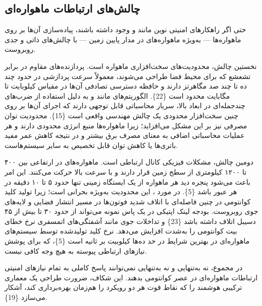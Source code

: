 \documentclass[a4paper,14pt]{extreport}
\begin{document}
\subsection{چالش‌های ارتباطات ماهواره‌ای}

حتی اگر راهکارهای امنیتی نوین مانند  و  وجود داشته باشند، پیاده‌سازی آن‌ها بر روی ماهواره‌ها --- به‌ویژه ماهواره‌های در مدار پایین زمین  --- با چالش‌های ذاتی و جدی روبروست.

نخستین چالش، محدودیت‌های سخت‌افزاری ماهواره است. پردازنده‌های مقاوم در برابر تشعشع  که برای محیط فضا طراحی می‌شوند، معمولاً سرعت پردازشی در حدود چند ده تا چند صد مگاهرتز دارند و حافظه دسترسی تصادفی  آن‌ها در مقیاس کیلوبایت تا مگابایت محدود است \{22\}. الگوریتم‌های  مانند  و  به دلیل استفاده از ضرب‌های چندجمله‌ای در ابعاد بالا، سربار محاسباتی  قابل توجهی دارند که اجرای آن‌ها بر روی چنین سخت‌افزار محدودی یک چالش مهندسی واقعی است \{15\}. محدودیت توان مصرفی نیز بر این مشکل می‌افزاید؛ زیرا ماهواره‌ها منبع انرژی محدودی دارند و هر عملیات محاسباتی اضافی به معنای مصرف برق بیشتر و در نتیجه کاهش عمر مفید باتری‌ها یا کاهش توان قابل تخصیص به سایر سیستم‌هاست.

دومین چالش، مشکلات فیزیکی کانال ارتباطی است. ماهواره‌های  در ارتفاعی بین ۴۰۰ تا ۱۲۰۰ کیلومتری از سطح زمین قرار دارند و با سرعت بالا حرکت می‌کنند. این امر باعث می‌شود پنجره دید  هر ماهواره از یک ایستگاه زمینی تنها حدود ۵ تا ۱۰ دقیقه در هر عبور باشد \{5\}. در مورد ، این محدودیت به‌ویژه بحرانی است؛ زیرا تولید کلید کوانتومی در چنین فاصله‌ای با اتلاف شدید فوتون‌ها  در مسیر انتشار فضایی و لایه‌های جوی روبروست. بودجه لینک اپتیکی  در یک پاس نمونه می‌تواند از حدود ۳۰ تا بیش از ۴۵ دسیبل اتلاف داشته باشد \{23\} و تداخلات جوی مانند آشفتگی‌های اتمسفری  نرخ خطای بیت کوانتومی  را به‌شدت افزایش می‌دهد. نرخ کلید تولیدشده توسط سیستم‌های  ماهواره‌ای در بهترین شرایط در حد ده‌ها کیلوبیت بر ثانیه است \{5\}، که برای پوشش نیازهای ارتباطی پیوسته به هیچ وجه کافی نیست.

در مجموع، نه  به‌تنهایی و نه  به‌تنهایی نمی‌توانند پاسخ کاملی به تمام نیازهای امنیتی ارتباطات ماهواره‌ای در عصر کوانتومی بدهند. این شکاف، ضرورت طراحی یک معماری ترکیبی هوشمند را که نقاط قوت هر دو رویکرد را هم‌زمان بهره‌برداری کند، آشکار می‌سازد \{19\}.
\end{document}
